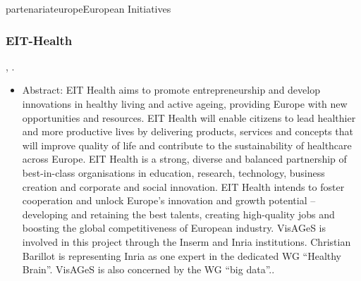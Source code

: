 \documentclass{ra2018}
\begin{document}
\begin{module}{partenariat}{europe}{European Initiatives}
\subsubsection{EIT-Health}
\begin{participants}    	
	, 	
	.
\end{participants}  
  \begin{itemize}
        \item Abstract:  EIT Health aims to promote entrepreneurship and develop innovations in healthy living and active ageing, providing Europe with new opportunities and resources. EIT Health will enable citizens to lead healthier and more productive lives by delivering products, services and concepts that will improve quality of life and contribute to the sustainability of healthcare across Europe. EIT Health is a strong, diverse and balanced partnership of best-in-class organisations in education, research, technology, business creation and corporate and social innovation. EIT Health intends to foster cooperation and unlock Europe’s innovation and growth potential – developing and retaining the best talents, creating high-quality jobs and boosting the global competitiveness of European industry. VisAGeS is involved in this project through the Inserm and Inria institutions. Christian Barillot is representing Inria as one expert in the dedicated WG “Healthy Brain”. VisAGeS is also concerned by the WG “big data”..
\end{itemize}  





\end{module}
\end{document}
